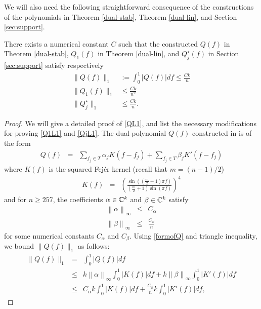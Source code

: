 \begin{subappendices}
We will also need the following straightforward consequence of the constructions of the polynomials in Theorem \ref{dual-stab}, Theorem \ref{dual-lin}, and Section \ref{sec:support}.
\begin{lemma}
\label{l1}
There exists a numerical constant $C$ such that the constructed $Q(f)$ in Theorem \ref{dual-stab}, $Q_1(f)$ in Theorem \ref{dual-lin}, and $Q_j^\star(f)$ in Section \ref{sec:support} satisfy respectively
\begin{align}
\|Q(f)\|_1 &:= \int_0^1{| Q(f)| df} \leq \frac{C k}{n}\label{QL1}\\
\| Q_1(f)\|_1 &\leq \frac{C k}{n^2}\label{Q1L1}\\
\|Q_j^\star\|_1 & \leq \frac{Ck}{n}\label{QjL1}.
\end{align}
\end{lemma}
\begin{proof}
We will give a detailed proof of \eqref{QL1}, and list the necessary modifications for proving \eqref{Q1L1} and \eqref{QjL1}. The dual polynomial $Q(f)$ constructed in \cite{cg_exact12} is of the
form
\begin{eqnarray}
  Q \left( f \right) & = & \sum_{f_j \in T} \alpha_j K \left( f - f_j \right)
  + \sum_{f_j \in T} \beta_j K' \left( f - f_j \right) \label{formofQ}
\end{eqnarray}
where $K \left( f \right)$ is the squared Fej\'er kernel (recall that $m = (n-1)/2$)
\begin{eqnarray*}
  K \left( f \right) & = & \left( \frac{\sin \left( \left( \frac{m}{2} + 1
  \right) \pi f \right)}{\left( \frac{m}{2} + 1 \right) \sin \left( \pi f
  \right)} \right)^4
\end{eqnarray*}
 and for $n \geq 257$, the coefficients
$\alpha \in \mathbb{C}^k$ and $\beta \in \mathbb{C}^k$ satisfy \cite[Lemma 2.2]{cg_exact12}
\begin{eqnarray*}
  \left\| \alpha \right\|_{\infty} & \leq & C_\alpha\\
  \left\| \beta \right\|_{\infty} & \leq & \frac{C_\beta}{n} 
\end{eqnarray*}
for some numerical constants $C_\alpha$ and $C_\beta$. 
Using \eqref{formofQ} and triangle inequality, we bound $\|Q(f)\|_1$ as follows: 
\begin{eqnarray}
  \|Q(f)\|_1 &=& \int_0^1 \left| Q \left( f \right) \right| d f\nonumber\\
  &\leq & k \left\| \alpha \right\|_\infty \int_0^1 \left| K \left( f\right) \right| d f + k \left\| \beta \right\|_\infty \int_0^1 \left| K' \left( f\right) \right| d f\label{Qbdgeneral1}\\
  & \leq & C_\alpha k \int_0^1 \left| K \left(f\right) \right| d f + \frac{C_\beta}{n} k \int_0^1 \left|K'(f)\right|d f \label{Q1bd},
 \end{eqnarray}
 

\end{proof}
\end{subappendices}
